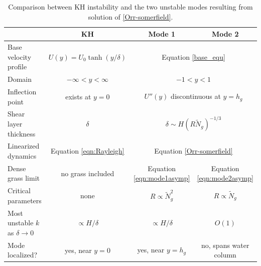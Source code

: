 \documentclass[12pt]{report}   %
\newcommand{\hg}{h_g}
\newcommand{\Rey}{{R}}
\newcommand{\Ndg}{\tilde{N}_g}
\begin{document}
%
\begin{table}
{}  %
\renewcommand{\arraystretch}{1.2}
 \begin{tabular}{l|c|c|c}
			& KH 				& Mode 1 		& Mode 2 \\ \hline
 Base velocity profile 	& $U(y) = U_0 \tanh(y/\delta)$			& \multicolumn{2}{c}{Equation \eqref{base_equ}} \\
 Domain 		& $-\infty < y < \infty$			& \multicolumn{2}{c}{$-1<y<1$} \\
 Inflection point	& exists at $y=0$				& \multicolumn{2}{c}{$U''(y)$ discontinuous at $y=\hg$} \\
 Shear layer thickness	& $\delta$					& \multicolumn{2}{c}{$\delta \sim  H\left(\Rey \Ndg \right)^{-1/3}$} \\
 Linearized dynamics	& Equation \eqref{eqn:Rayleigh}		& \multicolumn{2}{c}{Equation \eqref{Orr-somerfield}} \\
 Dense grass limit &  no grass included & Equation \eqref{eqn:mode1asymp} & Equation \eqref{eqn:mode2asymp}  \\
 Critical parameters	& none						& $\Rey \propto \Ndg^{2}$ 	& $\Rey \propto \Ndg$ \\
 Most unstable $k$ as $\delta \to 0$	& $\propto H/\delta$		& $\propto H/\delta$	& $O(1)$ \\
 Mode localized?	& yes, near $y=0$				& yes, near $y=\hg$			& no, spans water column
 \end{tabular}
 \caption{Comparison between KH instability and the two unstable modes resulting from solution of \ref{Orr-somerfield}.}
 \label{tab:comparison}
\end{table}
\clearpage{\pagestyle{empty}\cleardoublepage}
\end{document}
